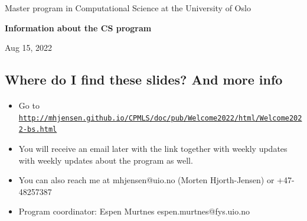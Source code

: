 \documentclass[%
oneside,                 %
final,                   %
10pt]{article}
\begin{document}

\newcommand{\exercisesection}[1]{\subsection*{#1}}






\thispagestyle{empty}

\begin{center}
{\LARGE\bf
\begin{spacing}{1.25}
Master program in Computational Science  at the University of Oslo
\end{spacing}
}
\end{center}


\begin{center}
{\bf Information about the CS program${}^{}$} \\ [0mm]
\end{center}

\begin{center}
\end{center}
    


\begin{center}
Aug 15, 2022
\end{center}

\vspace{1cm}


\subsection*{Where do I find these slides? And more info}


\paragraph{}
\begin{itemize}
\item Go to \href{{http://mhjensen.github.io/CPMLS/doc/pub/Welcome2022/html/Welcome2022-bs.html}}{\nolinkurl{http://mhjensen.github.io/CPMLS/doc/pub/Welcome2022/html/Welcome2022-bs.html}}

\item You will receive an email later with the link together with weekly updates with weekly updates about the program as well.

\item You can also reach me at mhjensen@uio.no (Morten Hjorth-Jensen) or +47-48257387

\item Program coordinator: Espen Murtnes espen.murtnes@fys.uio.no
\end{itemize}
\end{document}
